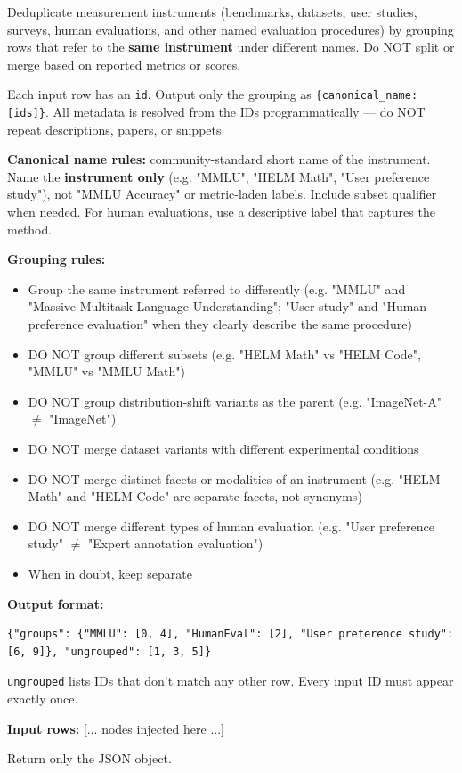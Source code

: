 \begin{tcolorbox}[breakable,enhanced,colback=blue!3,colframe=blue!40!black,title={Prompt},fonttitle=\bfseries,left=8pt,right=8pt,top=6pt,bottom=6pt]

Deduplicate measurement instruments (benchmarks, datasets, user studies, surveys, human evaluations, and other named evaluation procedures) by grouping rows that refer to the \textbf{same instrument} under different names. Do NOT split or merge based on reported metrics or scores.

Each input row has an \texttt{id}. Output only the grouping as \texttt{\{canonical\_name: [ids]\}}. All metadata is resolved from the IDs programmatically --- do NOT repeat descriptions, papers, or snippets.

\textbf{Canonical name rules:} community-standard short name of the instrument. Name the \textbf{instrument only} (e.g. "MMLU", "HELM Math", "User preference study"), not "MMLU Accuracy" or metric-laden labels. Include subset qualifier when needed. For human evaluations, use a descriptive label that captures the method.

\textbf{Grouping rules:}
\begin{itemize}
\item Group the same instrument referred to differently (e.g. "MMLU" and "Massive Multitask Language Understanding"; "User study" and "Human preference evaluation" when they clearly describe the same procedure)
\item DO NOT group different subsets (e.g. "HELM Math" vs "HELM Code", "MMLU" vs "MMLU Math")
\item DO NOT group distribution-shift variants as the parent (e.g. "ImageNet-A" $\neq$ "ImageNet")
\item DO NOT merge dataset variants with different experimental conditions
\item DO NOT merge distinct facets or modalities of an instrument (e.g. "HELM Math" and "HELM Code" are separate facets, not synonyms)
\item DO NOT merge different types of human evaluation (e.g. "User preference study" $\neq$ "Expert annotation evaluation")
\item When in doubt, keep separate
\end{itemize}

\textbf{Output format:}
\begin{verbatim}
{"groups": {"MMLU": [0, 4], "HumanEval": [2], "User preference study": [6, 9]}, "ungrouped": [1, 3, 5]}
\end{verbatim}
\texttt{ungrouped} lists IDs that don't match any other row. Every input ID must appear exactly once.

\textbf{Input rows:}
[... nodes injected here ...]

Return only the JSON object.
\end{tcolorbox}
